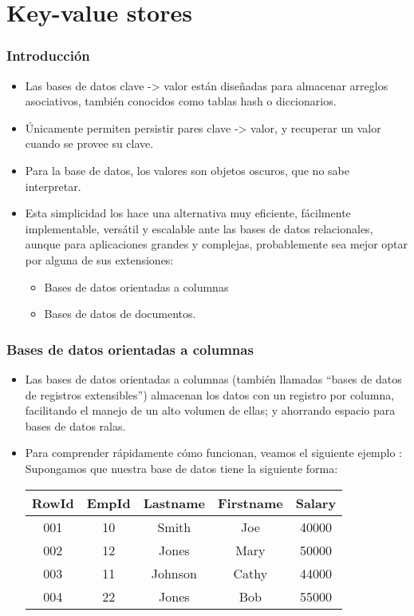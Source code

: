 \section{Key-value stores}
\begin{frame}
\frametitle{Introducción}
\begin{itemize}
\item	Las bases de datos clave -> valor están diseñadas para almacenar arreglos asociativos, también conocidos como tablas hash o diccionarios. \pause
\item	Únicamente permiten persistir pares clave -> valor, y recuperar un valor cuando se provee su clave. \pause
\item	Para la base de datos, los valores son objetos oscuros, que no sabe interpretar. \pause
\item	Esta simplicidad los hace una alternativa muy eficiente, fácilmente implementable, versátil y escalable ante las bases de datos relacionales, aunque para aplicaciones grandes y complejas, probablemente sea mejor optar por alguna de sus extensiones: \pause
\begin{itemize}
		\item	Bases de datos orientadas a columnas \pause
		\item	Bases de datos de documentos. \pause
\end{itemize}
\end{itemize}
\end{frame}

\begin{frame}
\frametitle{Bases de datos orientadas a columnas}
\begin{itemize}
\item	Las bases de datos orientadas a columnas (también llamadas ``bases de datos de registros extensibles'') almacenan los datos con un registro por columna, facilitando el manejo de un alto volumen de ellas; y ahorrando espacio para bases de datos ralas. \pause
\item	Para comprender rápidamente cómo funcionan, veamos el siguiente ejemplo : \pause \\
		Supongamos que nuestra base de datos tiene la siguiente forma: \\
		\begin{tabular}{|c|c|c|c|c|}
		\hline
		RowId	&	EmpId	&	Lastname	&	Firstname	&	Salary \\ \hline
		001		&	10		&	Smith		&	Joe			&	40000 \\ \hline
		002		&	12		&	Jones		&	Mary		&	50000 \\ \hline 
		003		&	11		&	Johnson		&	Cathy		&	44000  \\ \hline 
		004		&	22		&	Jones		&	Bob			&	55000  \\ \hline 
		\end{tabular}
\end{itemize}
\end{frame}

